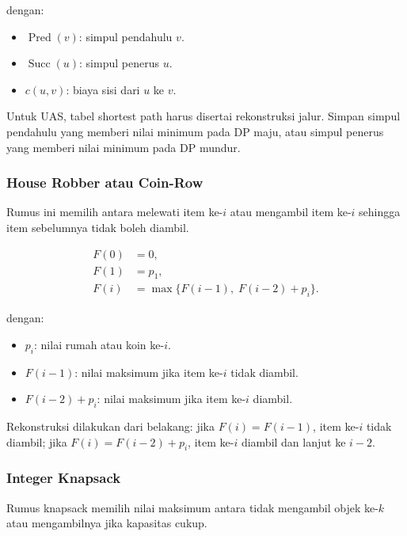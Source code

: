dengan:
\begin{itemize}
    \item $\operatorname{Pred}(v)$: simpul pendahulu $v$.
    \item $\operatorname{Succ}(u)$: simpul penerus $u$.
    \item $c(u,v)$: biaya sisi dari $u$ ke $v$.
\end{itemize}

Untuk UAS, tabel shortest path harus disertai rekonstruksi jalur. Simpan simpul pendahulu yang memberi nilai minimum pada DP maju, atau simpul penerus yang memberi nilai minimum pada DP mundur.

\subsubsection{House Robber atau Coin-Row}

\begin{jawab}
Rumus ini memilih antara melewati item ke-$i$ atau mengambil item ke-$i$ sehingga item sebelumnya tidak boleh diambil.
\end{jawab}

\begin{align}
    F(0)&=0, \label{eq:dp-house-base-zero}\\
    F(1)&=p_1, \label{eq:dp-house-base-one}\\
    F(i)&=\max\{F(i-1),\;F(i-2)+p_i\}.
    \label{eq:dp-house}
\end{align}

dengan:
\begin{itemize}
    \item $p_i$: nilai rumah atau koin ke-$i$.
    \item $F(i-1)$: nilai maksimum jika item ke-$i$ tidak diambil.
    \item $F(i-2)+p_i$: nilai maksimum jika item ke-$i$ diambil.
\end{itemize}

Rekonstruksi dilakukan dari belakang: jika $F(i)=F(i-1)$, item ke-$i$ tidak diambil; jika $F(i)=F(i-2)+p_i$, item ke-$i$ diambil dan lanjut ke $i-2$.

\subsubsection{Integer Knapsack}

\begin{jawab}
Rumus knapsack memilih nilai maksimum antara tidak mengambil objek ke-$k$ atau mengambilnya jika kapasitas cukup.
\end{jawab}

